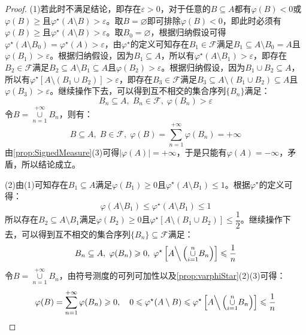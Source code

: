 \begin{proof}
	(1)若此时不满足结论，即存在$\varepsilon>0$，对于任意的$B\subseteq A$都有$\varphi(B)<0$或$\varphi(B)\geqslant$且$\varphi^{\star}(A\setminus B)>\varepsilon$。取$B=\varnothing$即可排除$\varphi(B)<0$，即此时必须有$\varphi(B)\geqslant$且$\varphi^{\star}(A\setminus B)>\varepsilon$。取$B_0=\varnothing$，根据归纳假设可得$\varphi^{\star}(A\setminus B_0)=\varphi^{\star}(A)>\varepsilon$，由$\varphi^{\star}$的定义可知存在$B_1\in\mathscr{F}$满足$B_1\subseteq A\setminus B_0=A$且$\varphi(B_1)>\varepsilon$。根据归纳假设，因为$B_1\subseteq A$，所以有$\varphi^{\star}(A\setminus B_1)>\varepsilon$，即存在$B_2\in\mathscr{F}$满足$B_2\subseteq A\setminus B_1\subseteq A$且$\varphi(B_2)>\varepsilon$。根据归纳假设，因为$B_1\cup B_2\subseteq A$，所以有$\varphi^{\star}[A\setminus(B_1\cup B_2)]>\varepsilon$，即存在$B_3\in\mathscr{F}$满足$B_3\subseteq A\setminus(B_1\cup B_2)\subseteq A$且$\varphi(B_3)>\varepsilon$。继续操作下去，可以得到互不相交的集合序列$\{B_n\}$满足：
	\begin{equation*}
		B_n\subseteq A,\;B_n\in\mathscr{F},\;\varphi(B_n)>\varepsilon
	\end{equation*}
	令$B=\underset{n=1}{\overset{+\infty}{\cup}}B_n$，则有：
	\begin{equation*}
		B\subseteq A,\;B\in\mathscr{F},\;\varphi(B)=\sum_{n=1}^{+\infty}\varphi(B_n)=+\infty
	\end{equation*}
	由\cref{prop:SignedMeasure}(3)可得$|\varphi(A)|=+\infty$，于是只能有$\varphi(A)=-\infty$，矛盾，所以结论成立。\par
	(2)由(1)可知存在$B_1\subseteq A$满足$\varphi(B_1)\geqslant0$且$\varphi^{\star}(A\setminus B_1)\leqslant1$。根据$\varphi^{\star}$的定义可得：
	\begin{equation*}
		\varphi(A\setminus B_1)\leqslant\varphi^{\star}(A\setminus B_1)\leqslant1
	\end{equation*}
	所以存在$B_2\subseteq A\setminus B_1$满足$\varphi(B_2)\geqslant0$且$\varphi^{\star}[A\setminus (B_1\cup B_2)]\leqslant\dfrac{1}{2}$。继续操作下去，可以得到互不相交的集合序列$\{B_n\}\subseteq\mathscr{F}$满足：
	\begin{equation*}
		B_n\subseteq A,\;\varphi(B_n)\geqslant0,\;\varphi^{\star}\left[A\Big\backslash\left(\underset{i=1}{\overset{n}{\cup}}B_n\right)\right]\leqslant\frac{1}{n}
	\end{equation*}
	令$B=\underset{n=1}{\overset{+\infty}{\cup}}B_n$，由符号测度的可列可加性以及\cref{prop:varphiStar}(2)(3)可得：
	\begin{equation*}
		\varphi(B)=\sum_{n=1}^{+\infty}\varphi(B_n)\geqslant0,\quad0\leqslant\varphi^{\star}(A\setminus B)\leqslant\varphi^{\star}\left[A\Big\backslash\left(\underset{i=1}{\overset{n}{\cup}}B_n\right)\right]\leqslant\frac{1}{n}

\end{equation*}
\end{proof}
